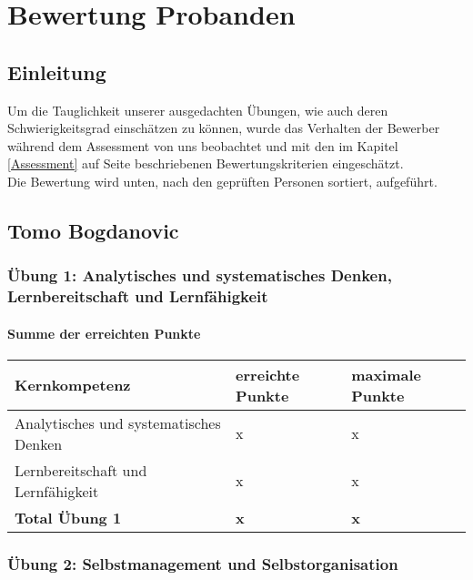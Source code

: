 \chapter{Bewertung Probanden}
\section{Einleitung}
Um die Tauglichkeit unserer ausgedachten Übungen, wie auch deren Schwierigkeitsgrad einschätzen zu können, wurde das Verhalten der Bewerber während dem  Assessment von uns beobachtet und mit den im Kapitel \ref{Assessment} auf Seite \pageref{Assessment} beschriebenen Bewertungskriterien eingeschätzt.\\
Die Bewertung wird unten, nach den geprüften Personen sortiert, aufgeführt.

\section{Tomo Bogdanovic}
\subsection{Übung 1: Analytisches und systematisches Denken, Lernbereitschaft und Lernfähigkeit}
\subsubsection{Summe der erreichten Punkte}
\begin{center}
  \begin{tabular}{ | p{7cm} | p{3cm} | p{3cm} |}
   \hline
   \textbf{Kernkompetenz} & \textbf{erreichte Punkte} & \textbf{maximale Punkte} \\ \hline
   Analytisches und systematisches Denken & x & x\\ \hline
  Lernbereitschaft und Lernfähigkeit & x & x\\ \hline
   \textbf{Total Übung 1} & \textbf{x} & \textbf{x}\\ \hline
  \end{tabular}
\end{center}
\subsection{Übung 2: Selbstmanagement und Selbstorganisation}
